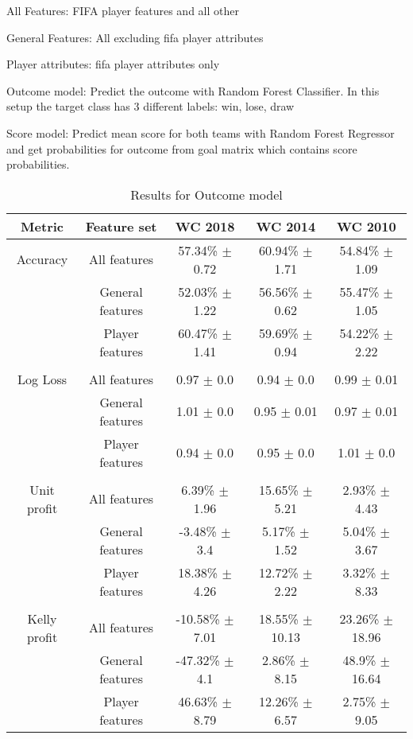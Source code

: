 \begin{description}
    \item All Features: FIFA player features and all other
    \item General Features: All excluding fifa player attributes
    \item Player attributes: fifa player attributes only
    \item Outcome model: Predict the outcome with Random Forest Classifier. In this setup the target class has 3 different labels: win, lose, draw
    \item Score model: Predict mean score for both teams with Random Forest Regressor and get probabilities for outcome from goal matrix which contains score probabilities.
\end{description}


\begin{table}
    \caption{Results for Outcome model}
    \begin{tabular}{| c  c| c| c| c|}
        \hline
        Metric& Feature set & \textbf{WC 2018} & \textbf{WC 2014} & \textbf{WC 2010}\\
        \hline
        Accuracy & All features & 57.34\% $\pm$ 0.72 & 60.94\% $\pm$ 1.71 & 54.84\% $\pm$ 1.09 \\
 & General features & 52.03\% $\pm$ 1.22 & 56.56\% $\pm$ 0.62 & 55.47\% $\pm$ 1.05 \\
 & Player features & 60.47\% $\pm$ 1.41 & 59.69\% $\pm$ 0.94 & 54.22\% $\pm$ 2.22 \\
 &  & & &  \\
Log Loss & All features & 0.97 $\pm$ 0.0 & 0.94 $\pm$ 0.0 & 0.99 $\pm$ 0.01 \\
 & General features & 1.01 $\pm$ 0.0 & 0.95 $\pm$ 0.01 & 0.97 $\pm$ 0.01 \\
 & Player features & 0.94 $\pm$ 0.0 & 0.95 $\pm$ 0.0 & 1.01 $\pm$ 0.0 \\
 &  & & &  \\
Unit profit & All features & 6.39\% $\pm$ 1.96 & 15.65\% $\pm$ 5.21 & 2.93\% $\pm$ 4.43 \\
 & General features & -3.48\% $\pm$ 3.4 & 5.17\% $\pm$ 1.52 & 5.04\% $\pm$ 3.67 \\
 & Player features & 18.38\% $\pm$ 4.26 & 12.72\% $\pm$ 2.22 & 3.32\% $\pm$ 8.33 \\
 &  & & &  \\
Kelly profit & All features & -10.58\% $\pm$ 7.01 & 18.55\% $\pm$ 10.13 & 23.26\% $\pm$ 18.96 \\
 & General features & -47.32\% $\pm$ 4.1 & 2.86\% $\pm$ 8.15 & 48.9\% $\pm$ 16.64 \\
 & Player features & 46.63\% $\pm$ 8.79 & 12.26\% $\pm$ 6.57 & 2.75\% $\pm$ 9.05 \\
 \hline
    \end{tabular}
    \label{table:onevsrestresults}
\end{table}


